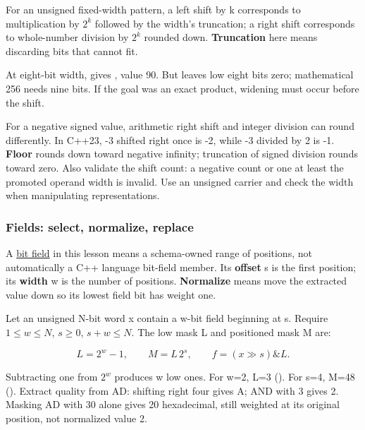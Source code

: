 For an unsigned fixed-width pattern, a left shift by k corresponds to multiplication by \(2^k\) followed by the width's truncation; a right shift corresponds to whole-number division by \(2^k\) rounded down. \textbf{Truncation} here means discarding bits that cannot fit.

At eight-bit width,  gives , value 90. But  leaves low eight bits zero; mathematical 256 needs nine bits. If the goal was an exact product, widening must occur before the shift.

For a negative signed value, arithmetic right shift and integer division can round differently. In C++23, -3 shifted right once is -2, while -3 divided by 2 is -1. \textbf{Floor} rounds down toward negative infinity; truncation of signed division rounds toward zero. Also validate the shift count: a negative count or one at least the promoted operand width is invalid. Use an unsigned carrier and check the width when manipulating representations.

\subsubsection{Fields: select, normalize, replace}\label{01-foundations-i-ch001-fields-select-normalize-replace}

\hypertarget{01-foundations-i-ch001-fields-select-normalize-replace}{}

A \hyperref[appendix-ac697f5c66e8]{bit field} in this lesson means a schema-owned range of positions, not automatically a C++ language bit-field member. Its \textbf{offset} s is the first position; its \textbf{width} w is the number of positions. \textbf{Normalize} means move the extracted value down so its lowest field bit has weight one.

Let an unsigned N-bit word x contain a w-bit field beginning at s. Require \(1\le w\le N\), \(s\ge0\), \(s+w\le N\). The low mask L and positioned mask M are:

\[
L=2^w-1,\qquad M=L\,2^s,\qquad f=(x\gg s)\mathbin{\&}L.
\]

Subtracting one from \(2^w\) produces w low ones. For w=2, L=3 (). For s=4, M=48 (). Extract quality from AD: shifting right four gives A; AND with 3 gives 2. Masking AD with 30 alone gives 20 hexadecimal, still weighted at its original position, not normalized value 2.

